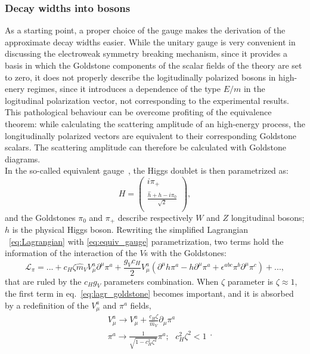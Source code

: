 \subsubsection{Decay widths into bosons}
\label{sec:HVT_decay_bosons}
As a starting point, a proper choice of the gauge makes the derivation of the approximate decay widths easier. While the unitary gauge is very convenient in discussing the electroweak symmetry breaking mechanism, since it provides a basis in which the Goldstone components of the scalar fields of the theory are set to zero, it does not properly describe the logitudinally polarized bosons in high-enery regimes, since it introduces a dependence of the type $E/m$ in the logitudinal polarization vector, not corresponding to the experimental results. This pathological behaviour can be overcome profiting of the equivalence theorem: while calculating the scattering amplitude of an high-energy process, the longitudinally polarized vectors are equivalent to their corresponding Goldstone scalars. The scattering amplitude can therefore be calculated with Goldstone diagrams.\\
In the so-called equivalent gauge~\cite{Wulzer:2013mza}, the Higgs doublet is then parametrized as:
\begin{equation}
H =
\begin{pmatrix}
i \pi_+ \\
\frac{\hat{h} + h -i \pi_0}{\sqrt{2}} \\
\end{pmatrix}
,
\label{eq:equiv_gauge}
\end{equation}
and the Goldstones $\pi_0$ and $\pi_+$ describe respectively $W$ and $Z$ longitudinal bosons; $h$ is the physical Higgs boson. Rewriting the simplified Lagrangian ~\ref{eq:Lagrangian} with \ref{eq:equiv_gauge} parametrization, two terms hold the information of the interaction of the $V$s with the Goldstones:
\begin{equation}
\mathcal{L}_{\pi} = ... + c_H \zeta {\hat{m}}_V V_{\mu}^a {\partial}^{\mu} {\pi}^a + \frac{g_V c_H}{2} V_{\mu}^a \left( {\partial}^{\mu} h {\pi}^a - h {\partial}^{\mu} {\pi}^a + {\epsilon}^{abc} \pi^b \partial^{\mu} \pi^c \right) + ...
,
\label{eq:lagr_goldstone}
\end{equation}
that are ruled by the $c_H g_V$ parameters combination. When $\zeta$ parameter is $\zeta \approx 1$, the first term in eq.~\ref{eq:lagr_goldstone} becomes important, and it is absorbed by a redefinition of the $V_{\mu}^a$ and $\pi^a$ fields,
\begin{equation}
\begin{split}
 & V_{\mu}^a \rightarrow V_{\mu}^a + \frac{c_H \zeta}{\hat{m}_V} \partial_{\mu} \pi^a\\
 & \pi^a \rightarrow \frac{1}{\sqrt{1 - c_H^2 \zeta^2}} \pi^a; \mbox{ } c_H^2 \zeta^2 < 1\\
\end{split}
.
\label{eq:field_redef}
\end{equation}

